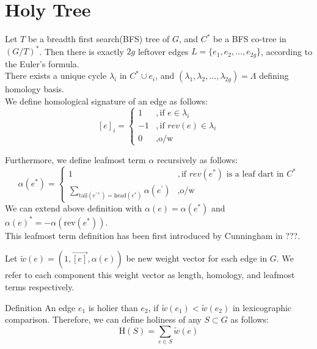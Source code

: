 \documentclass{article}
\begin{document}
\section{Holy Tree}
Let $T$ be a breadth first search(BFS) tree of $G$, and $C^{*}$ be a BFS 
co-tree in $(G/T)^*$. Then there is exactly $2g$ leftover edges 
$L = \{e_1, e_2, \ldots, e_{2g}\}$, according to the Euler's formula. \\

There exists a unique cycle $\lambda_i$ in $C^{*} \cup {e_i}$, and $(\lambda_1, 
\lambda_2, \ldots, \lambda_{2g}) = \Lambda$ defining homology basis. \\
We define homological signature of an edge as follows:
\[ [e]_{i} = \begin{cases} 1 & ,\mbox{if } e \in \lambda_i \\
                          -1 & ,\mbox{if } rev(e) \in \lambda_i \\
                           0 & ,\mbox{o/w} \end{cases}\]

Furthermore, we define leafmost term $\alpha$ recursively as follows: \\
\[ \alpha(e^*) = 
  \begin{cases} 1 & ,\mbox{if } rev(e^*) \mbox{ is a leaf dart in } C^{*} \\
                           \sum \limits_{ \text{tail}(e^{'*})
                           = \text{head}(e^*) } \alpha(e^{'}) & ,
                           \mbox{o/w} \end{cases}\]
We can extend above definition with $\alpha(e) = \alpha(e^*)$ and 
  $\alpha(e)^* = - \alpha(\text{rev}(e^*))$. \\

This leafmost term definition has been first introduced by Cunningham in 
{\color{red}???}.

Let $\tilde w(e) = ( 1, \vec{[e]}, \alpha(e) )$ be new
weight vector for each edge in $G$. We refer to each component this weight vector
as length, homology, and leafmost terms respectively. \\

\begin{oneshot}{Definition}
An edge $e_1$ is holier than $e_2$, 
if $\tilde w(e_1) < \tilde w(e_2)$ in lexicographic comparison. 
Therefore, we can define holiness of any $S \subset G $ as follows:
\[\text{H}(S) = \sum \limits_{e \in S} \tilde w(e)\]
\end{oneshot}
\end{document}
